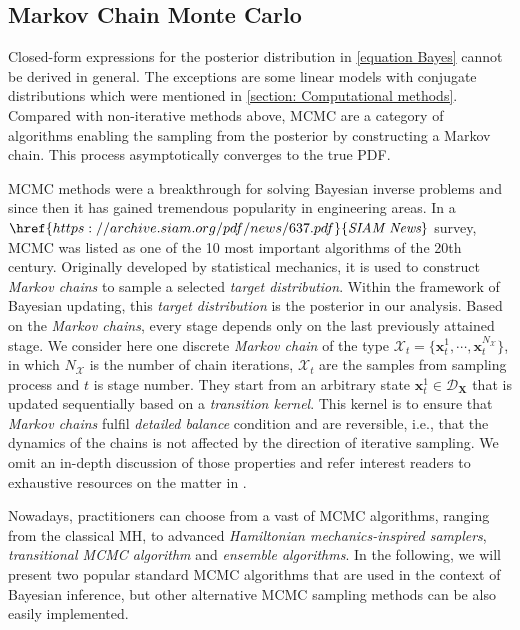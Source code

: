 \subsection{Markov Chain Monte Carlo}
Closed-form expressions for the posterior distribution in \cref{equation Bayes} cannot be derived in general. The exceptions are some linear models with conjugate distributions which were mentioned in \cref{section: Computational methods}. Compared with non-iterative methods above, \acrfull{MCMC} are a category of algorithms enabling the sampling from the posterior by constructing a Markov chain. This process asymptotically converges to the true \acrshort{PDF}.

\acrshort{MCMC} methods were a breakthrough for solving Bayesian inverse problems and since then it has gained tremendous popularity in engineering areas. In a $\href{https://archive.siam.org/pdf/news/637.pdf}{\textit{SIAM News}}$ survey, \acrshort{MCMC} was listed as one of the 10 most important algorithms of the 20th century. Originally developed by statistical mechanics, it is used to construct \textit{Markov chains} to sample a selected \textit{target distribution}. Within the framework of Bayesian updating, this \textit{target distribution} is the posterior in our analysis. Based on the \textit{Markov chains}, every stage depends only on the last previously attained stage. We consider here one discrete \textit{Markov chain} of the type $\mathcal{X}_{t} =\{\boldsymbol{x}_{t}^{1},\cdots,\boldsymbol{x}_{t}^{N_{\mathcal{X}}}\}$, in which $N_{\mathcal{X}}$ is the number of chain iterations, $\mathcal{X}_{t}$ are the samples from sampling process and $t$ is stage number. They start from an arbitrary state $\boldsymbol{x}_{t}^{1} \in \mathcal{D}_{\bm{X}}$ that is updated sequentially based on a \textit{transition kernel}. This kernel is to ensure that \textit{Markov chains} fulfil \textit{detailed balance} condition and are reversible, i.e., that the dynamics of the chains is not affected by the direction of iterative sampling. We omit an in-depth discussion of those properties and refer interest readers to exhaustive resources on the matter in \cite{murphy2012}.

Nowadays, practitioners can choose from a vast of \acrshort{MCMC} algorithms, ranging from the classical \acrfull{MH}, to advanced \textit{Hamiltonian mechanics-inspired samplers}, \textit{transitional MCMC algorithm} and \textit{ensemble algorithms}. In the following, we will present two popular standard \acrshort{MCMC} algorithms that are used in the context of Bayesian inference, but other alternative \acrshort{MCMC} sampling methods can be also easily implemented.

